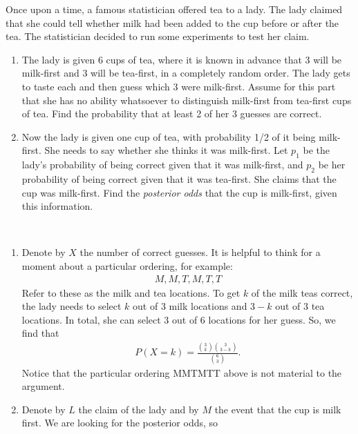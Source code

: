 
\setcounter{theorem}{14}
\begin{exercise}[BH.3.31]
  Once upon a time, a famous statistician offered tea to a lady. The lady claimed that she could tell whether milk had been added to the cup before or after the tea. The statistician decided to run some experiments to test her claim.
    \begin{enumerate}
        \item The lady is given 6 cups of tea, where it is known in advance that 3 will be milk-first and 3 will be tea-first, in a completely random order. The lady gets to taste each and then guess which 3 were milk-first. Assume for this part that she has no ability whatsoever to distinguish milk-first from tea-first cups of tea. Find the probability that at least 2 of her 3 guesses are correct.
        \item Now the lady is given one cup of tea, with probability 1/2 of it being milk-first. She needs to say whether she thinks it was milk-first. Let $p_1$ be the lady's probability of being correct given that it was milk-first, and $p_2$ be her probability of being correct given that it was tea-first. She claims that the cup was milk-first. Find the \emph{posterior odds} that the cup is milk-first, given this information.
    \end{enumerate}
\begin{solution}~
    \begin{enumerate}
        \item Denote by $X$ the number of correct guesses. It is helpful to think for a moment about a particular ordering, for example:
        \begin{align*}
            M,M,T,M,T,T
        \end{align*}
        Refer to these as the milk and tea locations. To get $k$ of the milk teas correct, the lady needs to select $k$ out of 3 milk locations and $3-k$ out of 3 tea locations. In total, she can select 3 out of 6 locations for her guess. So, we find that
        \begin{align*}
            P(X=k) = \frac{{3 \choose k}{3 \choose 3-k}}{{6 \choose 3}}.
        \end{align*}
        Notice that the particular ordering MMTMTT above is not material to the argument.
        \item  Denote by $L$ the claim of the lady and by $M$ the event that the cup is milk first. We are looking for the posterior odds, so
        \begin{align*}

\end{align*}
\end{enumerate}
\end{solution}
\end{exercise}
